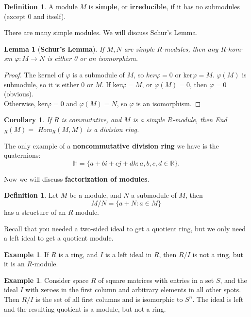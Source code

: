 \documentclass[9pt,reqno,twoside]{amsbook}
\theoremstyle{plain}
\numberwithin{section}{chapter}
\numberwithin{equation}{chapter}
\newtheorem{lem}[theorem]{Lemma}
\newtheorem{Cor}[theorem]{Corollary}
\theoremstyle{definition}
\newtheorem{Def}[theorem]{Definition}
\newtheorem{Ex}[theorem]{Example}
\theoremstyle{remark}
\theoremstyle{plain}
\renewcommand{\phi}{\varphi}
\begin{document}
\begin{Def}
A module $M$ is \textbf{simple}, or \textbf{irreducible}, if it has no submodules (except $0$ and itself). 
\end{Def}
There are many simple modules. We will discuss Schur's Lemma. 

\begin{lem}[\textbf{Schur's Lemma}]
If $M,N$ are simple $R$-modules, then any $R$-hom-sm $\phi: M \to N$ is either 0 or an isomorphism. 
\end{lem}

\begin{proof}
The kernel of $\phi$ is a submodule of $M$, so $ker\phi = 0$ or ker$\phi = M$. $\phi(M)$ is submodule, so it is either $0$ or $M$. If ker$\phi = M$, or $\phi(M) = 0$, then $\phi = 0$ (obvious). \\
Otherwise, ker$\phi = 0$ and $\phi(M) = N$, so $\phi$ is an isomorphism. 
\end{proof}
\begin{Cor}
If $R$ is commutative, and $M$ is a simple $R$-module, then End$_R(M) = $ Hom$_R(M,M)$ is a division ring. 
\end{Cor}

The only example of a \textbf{noncommutative division ring} we have is the quaternions:
 $$
\mathbb{H} = \{a + bi + cj + dk:a,b,c,d \in \mathbb{R}\}.
$$

Now we will discuss \textbf{factorization of modules}. 
\begin{Def}
Let $M$ be a module, and $N$ a submodule of $M$, then 
$$
M/N = \{a + N: a \in M\}
$$
has a structure of an $R$-module. 
\end{Def}

Recall that you needed a two-sided ideal to get a quotient ring, but we only need a left ideal to get a quotient module. 

\begin{Ex}
If $R$ is a ring, and $I$ is a left ideal in $R$, then $R/I$ is not a ring, but it is an $R$-module. 
\end{Ex}

\begin{Ex}
Consider space $R$ of square matrices with entries in a set $S$, and the ideal $I$ with zeroes in the first column and arbitrary elements in all other spots. Then $R/I$ is the set of all first columns and is isomorphic to $S^n$. The ideal is left and the resulting quotient is a module, but not a ring. 
\end{Ex}
\end{document}

